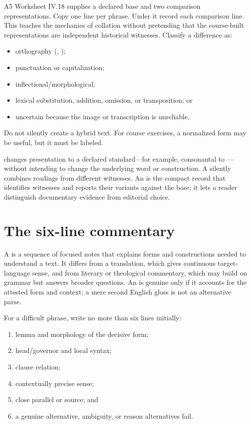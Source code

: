\begin{courseunit}{A5}
Worksheet IV.18 supplies a declared base and two comparison representations.
Copy one line per phrase. Under it record each comparison line. This teaches
the mechanics of collation without pretending that the course-built
representations are independent historical witnesses. Classify a difference
as:

\begin{itemize}
  \item orthography (, );
  \item punctuation or capitalization;
  \item inflectional/morphological;
  \item lexical substitution, addition, omission, or transposition; or
  \item uncertain because the image or transcription is unreliable.
\end{itemize}

Do not silently create a hybrid text. For course exercises, a normalized form
may be useful, but it must be labeled.

 changes presentation to a declared standard---for
example, consonantal  to ---without intending to change the
underlying word or construction. A  silently combines
readings from different witnesses. An  is the compact record
that identifies witnesses and reports their variants against the base; it lets
a reader distinguish documentary evidence from editorial choice.

\section{The six-line commentary}

A  is a sequence of focused notes that explains
forms and constructions needed to understand a text. It differs from a
translation, which gives continuous target-language sense, and from literary
or theological commentary, which may build on grammar but answers broader
questions. An  is genuine only if it accounts for
the attested form and context; a mere second English gloss is not an
alternative parse.

For a difficult phrase, write no more than six lines initially:

\begin{enumerate}
  \item lemma and morphology of the decisive form;
  \item head/governor and local syntax;
  \item clause relation;
  \item contextually precise sense;
  \item close parallel or source; and
  \item a genuine alternative, ambiguity, or reason alternatives fail.
\end{enumerate}


\end{courseunit}
